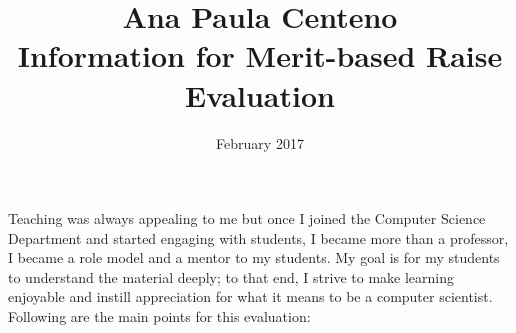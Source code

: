\documentclass[11pt]{article}
\begin{document}
\title{Ana Paula Centeno \\ Information for Merit-based Raise Evaluation\vspace{-3ex}}
\date{February 2017}
\maketitle
\thispagestyle{empty} %

\section*{}
Teaching was always appealing to me but once I joined the Computer
Science Department and started engaging with students, I became more
than a professor, I became a role model and a mentor to my
students. My goal is for my students to understand the material
deeply; to that end, I strive to make learning enjoyable and instill
appreciation for what it means to be a computer scientist. Following
are the main points for this evaluation:

\end{document}
